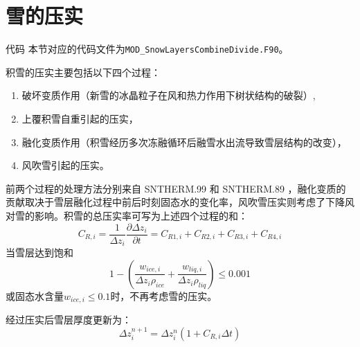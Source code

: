 \section{雪的压实}\label{雪的压实}
\begin{mymdframed}{代码}
本节对应的代码文件为\texttt{MOD\_SnowLayersCombineDivide.F90}。
\end{mymdframed}

积雪的压实主要包括以下四个过程：
\begin{enumerate}
\item 破坏变质作用（新雪的冰晶粒子在风和热力作用下树状结构的破裂）,
\item 上覆积雪自重引起的压实，
\item 融化变质作用（积雪经历多次冻融循环后融雪水出流导致雪层结构的改变），
\item 风吹雪引起的压实。
\end{enumerate}

前两个过程的处理方法分别来自 SNTHERM.99 \citep{jordan1999heat}和 SNTHERM.89 \citep{jordan1991one}，融化变质的贡献取决于雪层融化过程中前后时刻固态水的变化率，风吹雪压实则考虑了下降风对雪的影响。积雪的总压实率可写为上述四个过程的和：
%
\begin{equation}
C_{R,i}=\frac{1}{\Delta {z_i}} \frac{\partial \Delta {z_i}}{\partial {t}}=C_{R1,i}+C_{R2,i}+C_{R3,i}+C_{R4,i}
\end{equation}
当雪层达到饱和
\begin{equation}
1-\left(\frac{w_{ice,i}}{ \Delta {z_i} \rho_{ice}}+\frac{w_{liq,i}}{ \Delta {z_i} \rho_{liq}}\right) \leqslant 0.001
\end{equation}
或固态水含量$w_{ice,i}\leqslant0.1$时，不再考虑雪的压实。

经过压实后雪层厚度更新为：
\begin{equation}
\Delta z_i^{n+1}=\Delta z_i^n\left(1+C_{R, i} \Delta t\right)
\end{equation}


